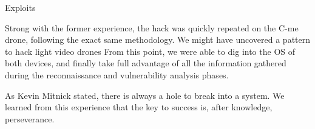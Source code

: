 \begin{chaptercover}{Exploits}
\begin{discussion}
Strong with the former experience, the hack was quickly repeated on the C-me drone, following the exact same methodology. We might have uncovered a pattern to hack light video drones
From this point, we were able to dig into the OS of both devices, and finally take full advantage of all the information gathered during the reconnaissance and vulnerability analysis phases.

As Kevin Mitnick stated, there is always a hole to break into a system. We learned from this experience that the key to success is, after knowledge, perseverance.
\end{discussion}

\end{chaptercover}
